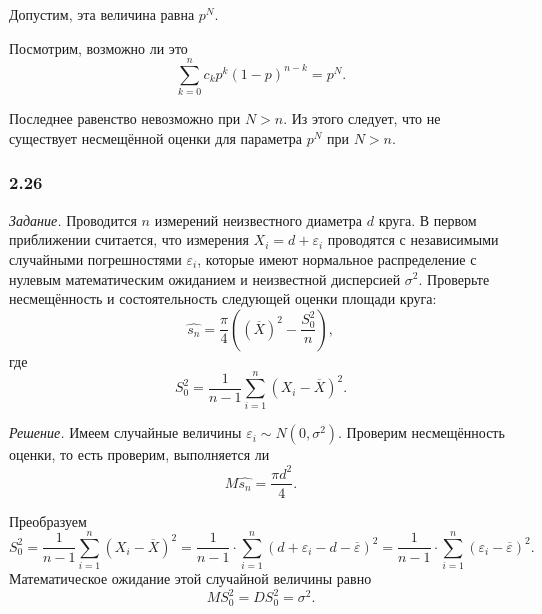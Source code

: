 Допустим, эта величина равна $p^N$.

Посмотрим, возможно ли это
$$ \sum \limits_{k = 0}^n c_k p^k \left( 1 - p \right)^{n - k} =
  p^N.$$

Последнее равенство невозможно при $N > n$.
Из этого следует, что не существует несмещённой оценки для параметра $p^N$ при $N > n$.

\subsubsection*{2.26}

\textit{Задание.} Проводится $n$ измерений неизвестного диаметра $d$ круга.
В первом приближении считается,
что измерения $X_i = d + \varepsilon_i$
проводятся с независимыми случайными погрешностями $ \varepsilon_i$,
которые имеют нормальное распределение с нулевым математическим ожиданием
и неизвестной дисперсией $ \sigma^2$.
Проверьте несмещённость и состоятельность следующей оценки площади круга:
$$ \hat{s_n} =
  \frac{ \pi }{4} \left( \left( \overline{X} \right)^2 - \frac{S_0^2}{n} \right),$$
где
$$S_0^2 =
  \frac{1}{n - 1} \sum \limits_{i = 1}^n \left( X_i - \overline{X} \right)^2.$$

\textit{Решение.} Имеем случайные величины $ \varepsilon_i \sim N \left( 0, \sigma^2 \right) $.
Проверим несмещённость оценки, то есть проверим, выполняется ли
$$M \hat{s_n} =
  \frac{ \pi d^2}{4}.$$

Преобразуем
$$S_0^2 =
  \frac{1}{n - 1} \sum \limits_{i = 1}^n \left( X_i - \overline{X} \right)^2 =
  \frac{1}{n - 1} \cdot
  \sum \limits_{i = 1}^n \left( d + \varepsilon_i - d - \overline{ \varepsilon } \right)^2 =
  \frac{1}{n - 1} \cdot
  \sum \limits_{i = 1}^n \left( \varepsilon_i - \overline{ \varepsilon } \right)^2.$$
Математическое ожидание этой случайной величины равно
$$MS_0^2 =
  DS_0^2 =
  \sigma^2.$$

